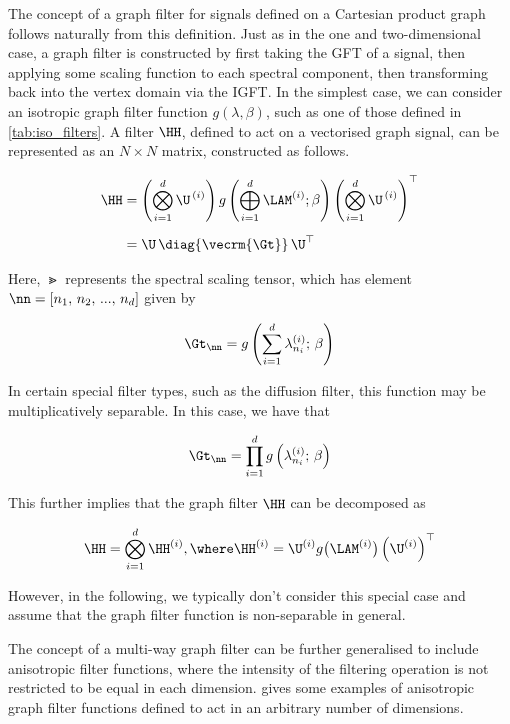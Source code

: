 The concept of a graph filter for signals defined on a Cartesian product graph follows naturally from this definition. Just as in the one and two-dimensional case, a graph filter is constructed by first taking the GFT of a signal, then applying some scaling function to each spectral component, then transforming back into the vertex domain via the IGFT. In the simplest case, we can consider an isotropic graph filter function $g(\lambda, \beta)$, such as one of those defined in \cref{tab:iso_filters}. A filter $\HH$, defined to act on a vectorised graph signal, can be represented as an $N \times N$ matrix, constructed as follows. 


\begin{align}
    \label{eq:H_def_dd}
    \HH &= \left( \bigotimes_{i=1}^d  \U^{\,(i)} \right) g\left(\bigoplus_{i=1}^d \LAM^{(i)}; \beta \right) \left(\bigotimes_{i=1}^d  \U^{\,(i)} \right)^\top \notag \\[0.2cm]
        &= \U \, \diag{\vecrm{\Gt}} \, \U^\top
\end{align}


Here, $\Gt$ represents the spectral scaling tensor, which has element $\nn = [n_1,\, n_2,\, ...,\, n_d]$ given by 

\begin{equation}
    \label{eq:Gn_dd1}
    \Gt_{\nn} = g\left(\sum_{i=1}^d \lambda^{(i)}_{n_i}; \, \beta\right)
\end{equation}

In certain special filter types, such as the diffusion filter, this function may be multiplicatively separable. In this case, we have that 

\begin{equation}
    \Gt_{\nn} = \prod_{i=1}^d g\left(\lambda^{(i)}_{n_i}; \, \beta\right)
\end{equation}

This further implies that the graph filter $\HH$ can be decomposed as 

\begin{equation}
    \HH = \bigotimes_{i=1}^d \HH^{(i)}, \where \HH^{(i)} = \U^{(i)} g \big(\LAM^{(i)}\big) \left(\U^{(i)}\right)^\top
\end{equation}

However, in the following, we typically don't consider this special case and assume that the graph filter function is non-separable in general. 

The concept of a multi-way graph filter can be further generalised to include anisotropic filter functions, where the intensity of the filtering operation is not restricted to be equal in each dimension.  gives some examples of anisotropic graph filter functions defined to act in an arbitrary number of dimensions. 


